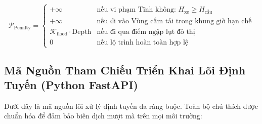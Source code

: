 \documentclass[11pt,a4paper]{article}
\begin{document}
\begin{equation}
  \mathcal{P}_{\text{Penalty}} = 
  \begin{cases} 
    +\infty & \text{nếu vi phạm Tĩnh không: } H_{\text{xe}} \ge H_{\text{cầu}} \\
    +\infty & \text{nếu đi vào Vùng cấm tải trong khung giờ hạn chế} \\
    \mathcal{K}_{\text{flood}} \cdot \text{Depth} & \text{nếu đi qua điểm ngập lụt đô thị} \\
    0 & \text{nếu lộ trình hoàn toàn hợp lệ}
  \end{cases}
\end{equation}

\subsection{Mã Nguồn Tham Chiếu Triển Khai Lõi Định Tuyến (Python FastAPI)}

Dưới đây là mã nguồn lõi xử lý định tuyến đa ràng buộc. Toàn bộ chú thích được chuẩn hóa để đảm bảo biên dịch mượt mà trên mọi môi trường:
\end{document}

